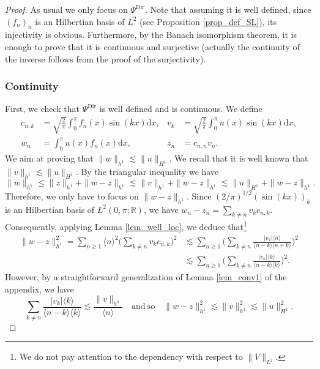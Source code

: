 \begin{proof} As usual we only focus on $\Psi^{\mathrm{Dir}}$. Note that assuming it is well defined, since $(f_n)_n$ is an Hilbertian basis of $L^2$ (see Proposition \ref{prop_def_SL}), its injectivity is obvious. Furthermore, by the Banach isomorphism theorem, it is enough to prove that it is continuous and surjective (\ie actually the continuity of the inverse follows from the proof of the surjectivity).

\subsubsection*{Continuity}
First, we check that $\Psi^{\mathrm{Dir}}$ is well defined and is continuous.
We define
\begin{equation}\label{eq_plein_de_monde}
\begin{aligned}
c_{n,k} &= \sqrt{\frac{2}\pi} \int_0^\pi f_n(x) \sin(k x) \mathrm{d}x, & v_k &= \sqrt{\frac{2}\pi} \int_0^\pi u(x) \sin(k x) \mathrm{d}x,\\
w_n &= \int_0^\pi u(x) f_n(x) \mathrm{d}x, & z_n &= c_{n,n} v_n.
\end{aligned}
\end{equation}
We aim at proving that $\| w\|_{h^1} \lesssim \| u \|_{H^1}$. We recall that it is well known that $\| v \|_{h^1} \lesssim \| u\|_{H^1}$. By the triangular inequality we have
\[
\| w\|_{h^1} \leq \| z \|_{h^1} + \|w - z \|_{h^1} \lesssim \| v \|_{h^1} + \|w - z \|_{h^1} \lesssim \| u \|_{H^1} + \|w - z \|_{h^1}.
\]
Therefore, we only have to focus on $\|w - z \|_{h^1}$. Since $(2/\pi)^{1/2}(\sin(kx))_k$ is an Hilbertian basis of $L^2(0,\pi;\mathbb{R})$, we have $
w_n - z_n = \sum_{k\neq n} v_k c_{n,k}$.
Consequently, applying Lemma \ref{lem_well_loc}, we deduce that\footnote{We do not pay attention to the dependency with respect to $\|V\|_{L^2}$.}
\begin{equation*}
\begin{split}
\|w - z \|_{h^1}^2 = \sum_{n\geq 1} \langle n \rangle^2 \biggl(\sum_{k\neq n} v_k c_{n,k} \biggr)^2 &\lesssim \sum_{n\geq 1} \biggl(\sum_{k\neq n} \frac{|v_k| \langle n \rangle}{\langle n-k \rangle \langle n+k \rangle } \biggr)^2 \\ &\lesssim \sum_{n\geq 1} \biggl(\sum_{k\neq n} \frac{|v_k| \langle k \rangle}{\langle n-k \rangle \langle k \rangle } \biggr)^2.
\end{split}
\end{equation*}
However, by a straightforward generalization of Lemma \ref{lem_conv1} of the appendix, we have
\[
\sum_{k\neq n} \frac{|v_k| \langle k \rangle}{\langle n-k \rangle \langle k \rangle } \lesssim \frac{\| v\|_{h^1}}{\langle n\rangle} \quad \mathrm{and } \ \mathrm{so} \quad \|w - z \|_{h^1}^2\lesssim \| v\|_{h^1}^2 \lesssim \|u\|_{H^1}^2.
\]


\end{proof}
